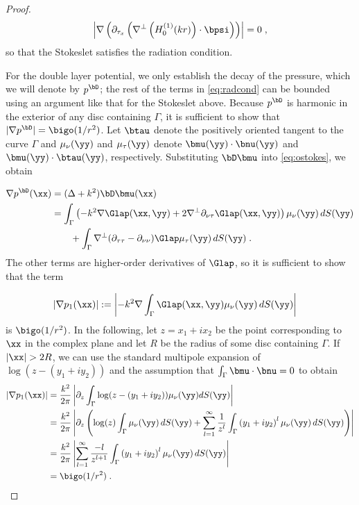 \begin{proof}
\begin{equation}
\left | \nabla \left( \partial_{\tau_x} \left ( 
\nabla^\perp \left (H_0^{(1)} (kr) \right ) \cdot \bpsi  \right )
\right) \right | = 0 \; , \nonumber
\end{equation}
so that the Stokeslet satisfies the radiation condition.

For the double layer potential, we only establish the
decay of the pressure, which we will denote by $p^\bD$;
the rest of the terms in \eqref{eq:radcond} can be bounded
using an argument like that for the Stokeslet above.
Because $p^\bD$ is harmonic in the exterior of any disc
containing $\Gamma$, it is sufficient to show that
$|\nabla p^\bD| = \bigo (1/r^2)$. Let $\btau$ denote the
positively oriented tangent to the curve $\Gamma$ and
$\mu_\nu(\yy)$ and $\mu_\tau(\yy)$ denote $\bmu(\yy) \cdot \bnu(\yy)$ and
$\bmu(\yy) \cdot \btau(\yy)$, respectively. Substituting
$\bD \bmu$ into \eqref{eq:ostokes}, we obtain

\begin{align*}
\nabla p^\bD(\xx) &= (\Delta + k^2) \bD \bmu(\xx) \\
&= \int_\Gamma \left (-k^2 \nabla \Glap (\xx,\yy) +
2 \nabla^\perp \partial_{\nu\tau} \Glap (\xx,\yy) \right ) \mu_\nu(\yy)
\, dS(\yy) \\
& \qquad + \int_\Gamma \nabla^\perp (\partial_{\tau\tau}-\partial_{\nu\nu})\Glap \mu_\tau(\yy)
\, dS(\yy) \; .
\end{align*}
The other terms are higher-order derivatives
of $\Glap$, so it is sufficient to show that the term

\begin{align*}
|\nabla p_1(\xx)| &:= \left |-k^2 \nabla \int_\Gamma \Glap(\xx,\yy)
\mu_\nu(\yy) \, dS(\yy) \right |
\end{align*}
is $\bigo (1/r^2)$. In the following, let $z = x_1 + i x_2$ be the
point corresponding to $\xx$ in the complex plane and let $R$
be the radius of some disc containing $\Gamma$. If $|\xx| > 2R$,
we can use the standard multipole expansion of $\log(z-(y_1+iy_2))$
and the assumption that $\int_\Gamma \bmu \cdot \bnu = 0$
to obtain
\begin{align*}
|\nabla p_1(\xx)| &= \frac{k^2}{2\pi} \left |  \partial_z \int_\Gamma \log(z-(y_1+iy_2))
\mu_\nu(\yy) dS(\yy) \right | \\
&= \frac{k^2}{2\pi} \left |  \partial_z  \left ( \log(z) \int_\Gamma \mu_\nu(\yy) \, dS(\yy)
+ \sum_{l=1}^\infty \frac{1}{z^l} \int_\Gamma \left( y_1+iy_2 \right)^l \mu_\nu(\yy) \, dS(\yy)
\right ) \right | \\
&= \frac{k^2}{2\pi} \left | \sum_{l=1}^\infty \frac{-l}{z^{l+1}}
\int_\Gamma \left( y_1+iy_2 \right)^l \mu_\nu(\yy) \, dS(\yy) \right | \\
&= \bigo (1/r^2) \; .
\end{align*}
\end{proof}

